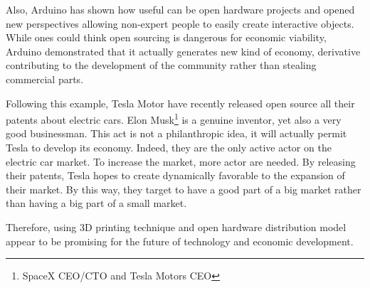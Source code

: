 Also, Arduino has shown how useful can be open hardware projects and opened new perspectives allowing non-expert people to easily create interactive objects. While ones could think open sourcing is dangerous for economic viability, Arduino demonstrated that it actually generates new kind of economy, derivative contributing to the development of the community rather than stealing commercial parts.

Following this example, Tesla Motor have recently released open source all their patents about electric cars. Elon Musk\footnote{SpaceX CEO/CTO and Tesla Motors CEO} is a genuine inventor, yet also a very good businessman. This act is not a philanthropic idea, it will actually permit Tesla to develop its economy. Indeed, they are the only active actor on the electric car market. To increase the market, more actor are needed. By releasing their patents, Tesla hopes to create dynamically favorable to the expansion of their market. By this way, they target to have a good part of a big market rather than having a big part of a small market.

Therefore, using 3D printing technique and open hardware distribution model appear to be promising for the future of technology and economic development.
